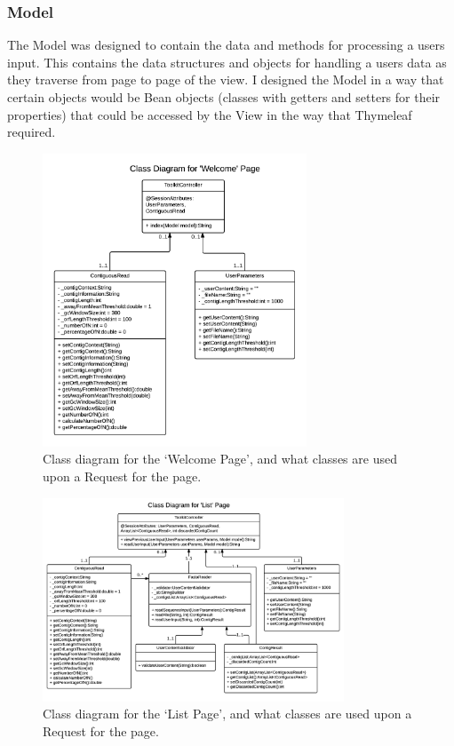 \subsubsection{Model}
The Model was designed to contain the data and methods for processing a users input. This contains the data structures and objects for handling a users data as they traverse from page to page of the view. I designed the Model in a way that certain objects would be Bean objects (classes with getters and setters for their properties) that could be accessed by the View in the way that Thymeleaf required.

\begin{figure}[H]
\centering
\includegraphics[width=0.7\textwidth]{images/umlwelcomepage}
\caption{Class diagram for the `Welcome Page', and what classes are used upon a Request for the page.}
\end{figure}

\begin{figure}[H]
\centering
\includegraphics[width=0.8\textwidth]{images/umllistpage}
\caption{Class diagram for the `List Page', and what classes are used upon a Request for the page.}
\end{figure}

